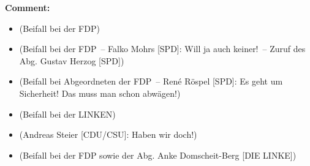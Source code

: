 \documentclass{article}
\begin{document}
\noindent\textbf{Comment:}
\begin{itemize}
    \setlength\itemsep{-3pt}
    \item (Beifall bei der FDP)
    \setlength\itemsep{-3pt}
    \item (Beifall bei der FDP – Falko Mohrs [SPD]: Will ja auch keiner! – Zuruf des Abg. Gustav Herzog [SPD])
    \setlength\itemsep{-3pt}
    \item (Beifall bei Abgeordneten der FDP – René Röspel [SPD]: Es geht um Sicherheit! Das muss man schon abwägen!)
    \setlength\itemsep{-3pt}
    \item (Beifall bei der LINKEN)
    \setlength\itemsep{-3pt}
    \item (Andreas Steier [CDU/CSU]: Haben wir doch!)
    \setlength\itemsep{-3pt}
    \item (Beifall bei der FDP sowie der Abg. Anke Domscheit-Berg [DIE LINKE])
\end{itemize}
\end{document}
